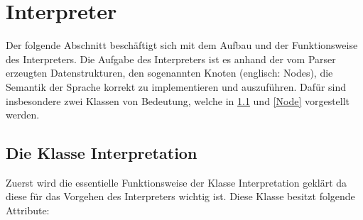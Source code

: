 \section{Interpreter}
\label{InterpreterIntro}
Der folgende Abschnitt beschäftigt sich mit dem Aufbau und der Funktionsweise des Interpreters. Die Aufgabe des Interpreters ist es anhand der vom Parser erzeugten Datenstrukturen, den sogenannten Knoten (englisch: Nodes), die Semantik der Sprache korrekt zu implementieren und auszuführen. Dafür sind insbesondere zwei Klassen von Bedeutung, welche in \ref{Interpretation} und \ref{Node} vorgestellt werden.

\subsection{Die Klasse Interpretation}
\label{Interpretation}
Zuerst wird die essentielle Funktionsweise der Klasse Interpretation geklärt da diese für das Vorgehen des Interpreters wichtig ist.
Diese Klasse besitzt folgende Attribute:

